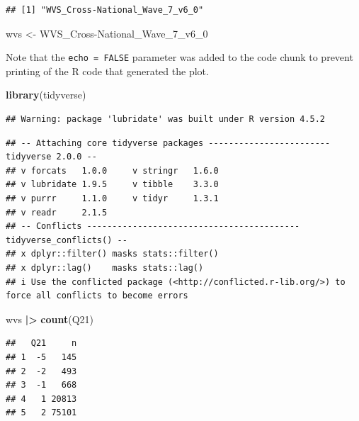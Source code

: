\documentclass[
]{article}
\newenvironment{Shaded}{\begin{snugshade}}{\end{snugshade}}
\newcommand{\AttributeTok}[1]{\textcolor[rgb]{0.13,0.29,0.53}{#1}}
\newcommand{\FunctionTok}[1]{\textcolor[rgb]{0.13,0.29,0.53}{\textbf{#1}}}
\newcommand{\NormalTok}[1]{#1}
\newcommand{\OtherTok}[1]{\textcolor[rgb]{0.56,0.35,0.01}{#1}}
\newcommand{\SpecialCharTok}[1]{\textcolor[rgb]{0.81,0.36,0.00}{\textbf{#1}}}
\newcommand{\StringTok}[1]{\textcolor[rgb]{0.31,0.60,0.02}{#1}}
\begin{document}
\begin{verbatim}
## [1] "WVS_Cross-National_Wave_7_v6_0"
\end{verbatim}

\begin{Shaded}
\begin{Highlighting}[]
\NormalTok{wvs }\OtherTok{\textless{}{-}} \StringTok{\textasciigrave{}}\AttributeTok{WVS\_Cross{-}National\_Wave\_7\_v6\_0}\StringTok{\textasciigrave{}}
\end{Highlighting}
\end{Shaded}

Note that the \texttt{echo\ =\ FALSE} parameter was added to the code
chunk to prevent printing of the R code that generated the plot.

\begin{Shaded}
\begin{Highlighting}[]
\FunctionTok{library}\NormalTok{(tidyverse)}
\end{Highlighting}
\end{Shaded}

\begin{verbatim}
## Warning: package 'lubridate' was built under R version 4.5.2
\end{verbatim}

\begin{verbatim}
## -- Attaching core tidyverse packages ------------------------ tidyverse 2.0.0 --
## v forcats   1.0.0     v stringr   1.6.0
## v lubridate 1.9.5     v tibble    3.3.0
## v purrr     1.1.0     v tidyr     1.3.1
## v readr     2.1.5     
## -- Conflicts ------------------------------------------ tidyverse_conflicts() --
## x dplyr::filter() masks stats::filter()
## x dplyr::lag()    masks stats::lag()
## i Use the conflicted package (<http://conflicted.r-lib.org/>) to force all conflicts to become errors
\end{verbatim}

\begin{Shaded}
\begin{Highlighting}[]
\NormalTok{wvs }\SpecialCharTok{|\textgreater{}} \FunctionTok{count}\NormalTok{(Q21)}
\end{Highlighting}
\end{Shaded}

\begin{verbatim}
##   Q21     n
## 1  -5   145
## 2  -2   493
## 3  -1   668
## 4   1 20813
## 5   2 75101
\end{verbatim}
\end{document}
